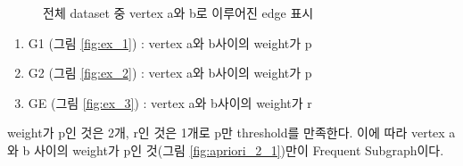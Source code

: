 \documentclass{oblivoir}
\begin{document}
		
		\begin{figure}[h]
			\centering
			\quad 
			\quad
			\quad 
			\caption{전체 dataset 중 vertex a와 b로 이루어진 edge 표시}
			\label{examples}
		\end{figure}
	
		\begin{enumerate}
			\item G1 (그림 \ref{fig:ex_1}) : vertex a와 b사이의 weight가 p
			\item G2 (그림 \ref{fig:ex_2}) : vertex a와 b사이의 weight가 p
			\item GE (그림 \ref{fig:ex_3}) : vertex a와 b사이의 weight가 r
		\end{enumerate}
		
		weight가 p인 것은 2개, r인 것은 1개로 p만 threshold를 만족한다. 이에 따라 vertex a와 b 사이의 weight가 p인 것(그림 \ref{fig:apriori_2_1})만이 Frequent Subgraph이다.
		
		\newpage
		
\end{document}
